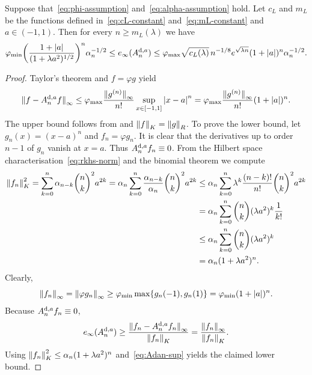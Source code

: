 \documentclass{mcom-l}
\numberwithin{equation}{section}
\numberwithin{theorem}{section} %
\begin{document}
\begin{theorem} \label{thm:derivative-unif}
  Suppose that~\eqref{eq:phi-assumption} and~\eqref{eq:alpha-assumption} hold.
  Let $c_L$ and $m_L$ be the functions defined in~\eqref{eq:cL-constant} and~\eqref{eq:mL-constant} and $a \in (-1, 1)$.
  Then for every $n \geq m_L(\lambda)$ we have
  \begin{equation*}
    \varphi_{\min} \bigg( \frac{1 + \abs[0]{a}}{(1 + \lambda a^2)^{1/2}}\bigg)^n \alpha_n^{-1/2} \leq e_\infty(A_n^{\textup{d}, a}) \leq \varphi_{\max} \sqrt{c_L(\lambda)} \, n^{-1/8} e^{\sqrt{\smash[b]{\lambda n}}} (1 + \abs[0]{a})^n \alpha_n^{-1/2}.
  \end{equation*}
\end{theorem}
\begin{proof}
    Taylor's theorem and $f = \varphi g$ yield
  \begin{equation*}
    \norm[0]{f - A_{n}^{\textup{d},a}f}_\infty \leq \varphi_{\max} \frac{\norm[0]{g^{(n)}}_\infty}{n!} \sup_{x \in [-1, 1]} \abs[0]{x - a}^n = \varphi_{\max} \frac{\norm[0]{g^{(n)}}_\infty}{n!} (1 + \abs[0]{a})^n.
  \end{equation*}
  The upper bound follows from  and $\norm[0]{f}_K = \norm[0]{g}_{R}$.
  To prove the lower bound, let $g_n(x) = (x - a)^n$ and $f_n = \varphi g_n$.
  It is clear that the derivatives up to order $n-1$ of $g_n$ vanish at $x = a$.
  Thus $A_n^{\textup{d},a} f_n \equiv 0$.
  From the Hilbert space characterisation~\eqref{eq:rkhs-norm} and the binomial theorem we compute
  \begin{align*}
    \norm[0]{f_n}_K^2 = \sum_{k=0}^n \alpha_{n-k} \binom{n}{k}^2 a^{2k} = \alpha_n \sum_{k=0}^n \frac{\alpha_{n-k}}{\alpha_n} \binom{n}{k}^2 a^{2k} &\leq \alpha_n \sum_{k=0}^n \lambda^k \frac{(n-k)!}{n!} \binom{n}{k}^2 a^{2k} \\
    &= \alpha_n \sum_{k=0}^n \binom{n}{k} (\lambda a^2)^k \frac{1}{k!}  \\
    &\leq \alpha_n \sum_{k=0}^n \binom{n}{k} (\lambda a^2)^k  \\
    &= \alpha_n (1 + \lambda a^2)^n.
  \end{align*}
  Clearly,
  \begin{equation} \label{eq:Adan-sup}
    \norm[0]{f_n}_\infty = \norm[0]{ \varphi g_n}_\infty \geq \varphi_{\min} \max\{ g_n(-1), g_n(1) \} = \varphi_{\min} (1 + \abs[0]{a})^n.
  \end{equation}
  Because $A_n^{\textup{d},a} f_n \equiv 0$,
  \begin{equation*}
    e_\infty(A_n^{\textup{d},a}) \geq \frac{\norm[0]{f_n - A_n^{\textup{d},a} f_n}_\infty}{\norm[0]{f_n}_K} = \frac{\norm[0]{f_n}_\infty}{\norm[0]{f_n}_K}.
  \end{equation*}
  Using $\norm[0]{f_n}_K^2 \leq \alpha_n (1 + \lambda a^2)^n$ and~\eqref{eq:Adan-sup} yields the claimed lower bound.
\end{proof}
\end{document}

